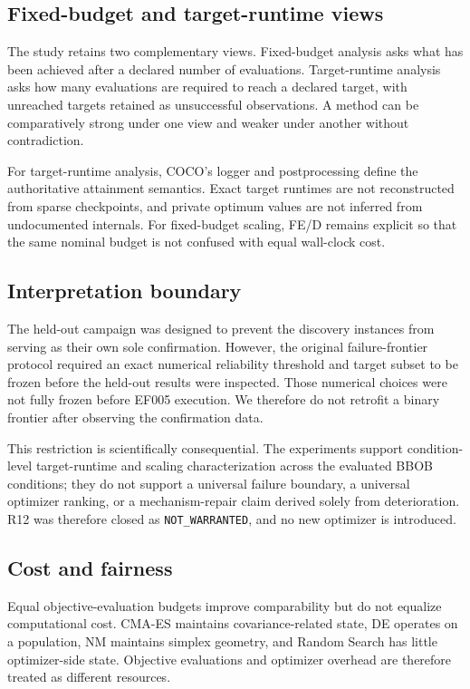 \subsection{Fixed-budget and target-runtime views}

The study retains two complementary views. Fixed-budget analysis asks what has been achieved after a declared number of evaluations. Target-runtime analysis asks how many evaluations are required to reach a declared target, with unreached targets retained as unsuccessful observations. A method can be comparatively strong under one view and weaker under another without contradiction.

For target-runtime analysis, COCO's logger and postprocessing define the authoritative attainment semantics. Exact target runtimes are not reconstructed from sparse checkpoints, and private optimum values are not inferred from undocumented internals. For fixed-budget scaling, FE/D remains explicit so that the same nominal budget is not confused with equal wall-clock cost.

\subsection{Interpretation boundary}

The held-out campaign was designed to prevent the discovery instances from serving as their own sole confirmation. However, the original failure-frontier protocol required an exact numerical reliability threshold and target subset to be frozen before the held-out results were inspected. Those numerical choices were not fully frozen before EF005 execution. We therefore do not retrofit a binary frontier after observing the confirmation data.

This restriction is scientifically consequential. The experiments support condition-level target-runtime and scaling characterization across the evaluated BBOB conditions; they do not support a universal failure boundary, a universal optimizer ranking, or a mechanism-repair claim derived solely from deterioration. R12 was therefore closed as \texttt{NOT\_WARRANTED}, and no new optimizer is introduced.

\subsection{Cost and fairness}

Equal objective-evaluation budgets improve comparability but do not equalize computational cost. CMA-ES maintains covariance-related state, DE operates on a population, NM maintains simplex geometry, and Random Search has little optimizer-side state. Objective evaluations and optimizer overhead are therefore treated as different resources.

